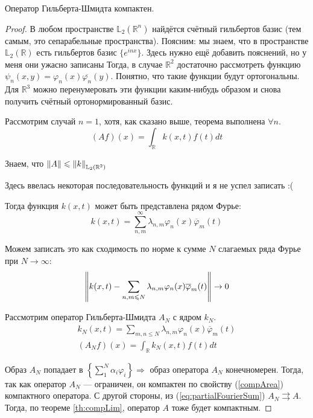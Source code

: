 \documentclass[12pt]{article}
\begin{document}
	\begin{state}
		Оператор Гильберта-Шмидта компактен.
	\end{state}
	\begin{proof}
		В любом пространстве $\mathbb{L}_2(\mathbb{R}^n)$ найдётся счётный гильбертов базис 
		(тем самым, это сепарабельные пространства).
		{\small
		Поясним: мы знаем, что в пространстве $\mathbb{L}_2(\mathbb{R})$ есть гильбертов базис $\{e^{inx}\}$.
		{\color{gray} Здесь нужно ещё добавить пояснений, но у меня они ужасно записаны}
		Тогда, в случае $\mathbb{R}^2$ достаточно рассмотреть функцию $\psi_n(x,y) = \varphi_n(x) \overline{\varphi_n}(y)$.
		Понятно, что такие функции будут ортогональны. Для $\mathbb{R}^3$ можно перенумеровать эти функции каким-нибудь образом
		и снова получить счётный ортонормированный базис.
		}
		
		Рассмотрим случай $n=1$, хотя, как сказано выше, теорема выполнена $\forall n$. 
		$$(Af)(x) = \int_{\mathbb{R}} k(x,t) f(t) dt$$
		
		Знаем, что $\left\| A \right\| \leqslant \left\| k \right\|_{\mathbb{L}_2(\mathbb{R}^2)}$
		
		{\color{gray} Здесь ввелась некоторая последовательность функций и я не успел записать :(}
		
		Тогда функция $k(x,t)$ может быть представлена рядом Фурье:
		$$k(x,t) = \sum_{n,m}^{\infty}\lambda_{n,m}\varphi_n(x)\overline{\varphi}_m(t)$$
		
		Можем записать это как сходимость по норме к сумме $N$ слагаемых ряда Фурье при $N \rightarrow \infty$:
		\begin{equation} \label{eq:partialFourierSum}
			\left\| k(x,t) - \sum_{n,m\leqslant N}\lambda_{n,m}\varphi_n(x)\overline{\varphi}_m(t) \right\| \rightarrow 0
		\end{equation}
		
		Рассмотрим оператор Гильберта-Шмидта $A_N$ с ядром $k_N$.
		\begin{gather}
			k_N(x,t) = \sum_{m,n \leq N} \lambda_{n,m} \varphi_n(x)\overline{\varphi}_m(t) \\
			(A_Nf)(x) = \int_{\mathbb{R}} k_N(x,t) f(t) dt
		\end{gather}
		
		Образ $A_N$ попадает в $\left\{\sum_1^N \alpha_i \varphi_i \right\} \Rightarrow$ образ оператора $A_N$ 
		конечномерен. Тогда, так как оператор $A_N$ --- ограничен, он компактен по свойству (\ref{compArea}) компактного оператора.
		С другой стороны, из (\ref{eq:partialFourierSum}) $A_N \rightrightarrows A$. Тогда, по теореме \ref{th:compLim}, оператор
		$A$ тоже будет компактным.
	\end{proof}
	
\end{document}
